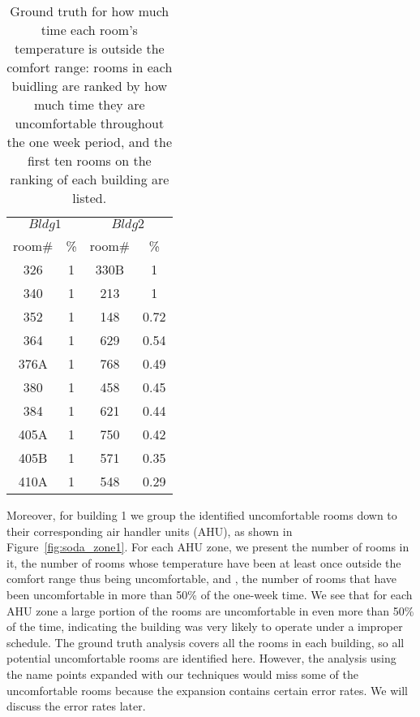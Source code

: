 \begin{table}[h]
 \begin{center}
	\begin{tabular}{|c|c|c|c|}
	\multicolumn{2}{c}{$Bldg 1$}
	 & \multicolumn{2}{c}{$Bldg 2$}\\
	\cline{1-4} 
	 room\# & \% & room\# & \%\\
	\cline{1-4}
	 326 & 1 & 330B & 1\\
	\cline{1-4}
	 340 & 1 & 213 & 1\\
	\cline{1-4}
	352 & 1 & 148 & 0.72\\
	\cline{1-4}
	364 & 1 & 629 & 0.54\\
	\cline{1-4}
	376A & 1 & 768 & 0.49\\
	\cline{1-4}
	380 & 1 & 458 & 0.45\\
	\cline{1-4}
	384 & 1 & 621 & 0.44\\
	\cline{1-4}
	405A & 1 & 750 & 0.42\\
	\cline{1-4}
	405B & 1 & 571 & 0.35\\
	\cline{1-4}
	410A & 1 & 548 & 0.29\\
	\cline{1-4}
	\end{tabular}
 \end{center}
 \caption{Ground truth for how much time each room's temperature is outside the comfort range: rooms in each buidling are ranked by how much time they are uncomfortable throughout the one week period, and the first ten rooms on the ranking of each building are listed.}
 \label{tab:uncmft}
\end{table}

Moreover, for building 1 we group the identified uncomfortable rooms down to their corresponding air handler units (AHU), as shown in Figure~\ref{fig:soda_zone1}. For each AHU zone, we present the number of rooms in it, the number of rooms whose temperature have been at least once outside the comfort range thus being uncomfortable, and , the number of rooms that have been uncomfortable in more than 50\% of the one-week time. We see that for each AHU zone a large portion of the rooms are uncomfortable in even more than 50\% of the time, indicating the building was very likely to operate under a improper schedule. The ground truth analysis covers all the rooms in each building, so all potential uncomfortable rooms are identified here. However, the analysis using the name points expanded with our techniques would miss some of the uncomfortable rooms because the expansion contains certain error rates. We will discuss the error rates later.

